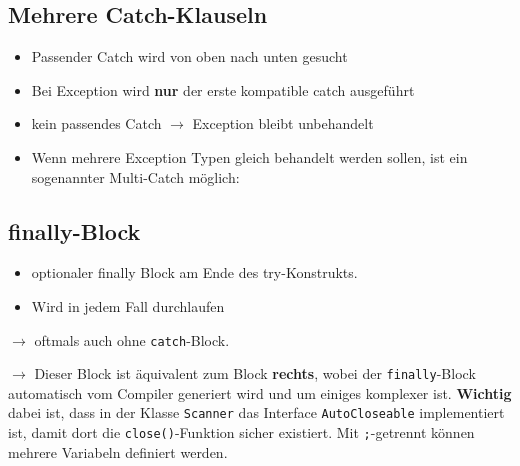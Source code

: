 	\subsection*{Mehrere Catch-Klauseln}
		\begin{minipage}{8.5cm}
			\begin{itemize}[noitemsep]
				\item Passender Catch wird von oben nach unten gesucht
				\item Bei Exception wird \textbf{nur} der erste kompatible catch ausgeführt
				\item kein passendes Catch $\rightarrow$ Exception bleibt unbehandelt
			\end{itemize}
			\vspace*{0.5cm}
			\begin{itemize}[noitemsep]
				\item Wenn mehrere Exception Typen gleich behandelt werden sollen, ist ein sogenannter Multi-Catch möglich:
			\end{itemize}
		\end{minipage}
		\hspace{0.5cm}
		\begin{minipage}{9.8cm}
			
			
		\end{minipage}
	\subsection*{finally-Block}
		\begin{itemize}[noitemsep]
			\item optionaler finally Block am Ende des try-Konstrukts.
			\item Wird in jedem Fall durchlaufen			
		\end{itemize}
		\begin{minipage}[t]{10cm}
			
		\end{minipage}
		\hspace*{0.5cm}
		\begin{minipage}[t]{7.3cm}
			
			$\rightarrow$ oftmals auch ohne \texttt{catch}-Block.
		\end{minipage}

		\begin{minipage}[t]{9cm}
			
			$\rightarrow$ Dieser Block ist äquivalent zum Block \textbf{rechts}, wobei der \texttt{finally}-Block automatisch vom Compiler generiert wird und um einiges komplexer ist. \textbf{Wichtig} dabei ist, dass in der Klasse \texttt{Scanner} das Interface \texttt{AutoCloseable} implementiert ist, damit dort die \texttt{close()}-Funktion sicher existiert. Mit \texttt{;}-getrennt können mehrere Variabeln definiert werden.
		\end{minipage}
		\hspace*{0.5cm}
		\begin{minipage}[t]{8.3cm}
			
		\end{minipage}